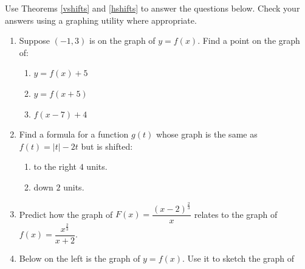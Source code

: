 \documentclass{ximera}
\begin{document}
 \begin{example} \label{shiftex}  Use Theorems  \ref{vshifts} and \ref{hshifts} to answer the questions below.  Check your answers using a graphing utility where appropriate.
 
 \begin{enumerate}
 
 \item  Suppose $(-1,3)$ is on the graph of $y = f(x)$.  Find a point on the graph of:
 
 \begin{multicols}{3}
 
 \begin{enumerate}
 
 \item $y = f(x)+5$
 
 \item $y = f(x+5)$
 
 \item  $f(x-7)+4$
 
 \end{enumerate}
 
 \end{multicols}
 
 \item  Find a formula for a function $g(t)$ whose graph is the same as $f(t) = |t|-2t$ but is shifted:
 
 \begin{multicols}{2}
 
 \begin{enumerate}
 
 \item to the right $4$ units.
 
 \item down $2$ units.
 
 \end{enumerate}
 
 \end{multicols}
 
 \item Predict how the graph of $F(x) = \dfrac{(x-2)^{\frac{2}{3}}}{x}$ relates to the graph of $f(x) = \dfrac{x^{\frac{2}{3}}}{x+2}$. 
 
\item  Below on the left is the graph of $y = f(x)$.  Use it to sketch the graph of

  \begin{multicols}{3}
 
 \begin{enumerate}
 

\end{enumerate}
\end{multicols}
\end{enumerate}
\end{example}
\end{document}
